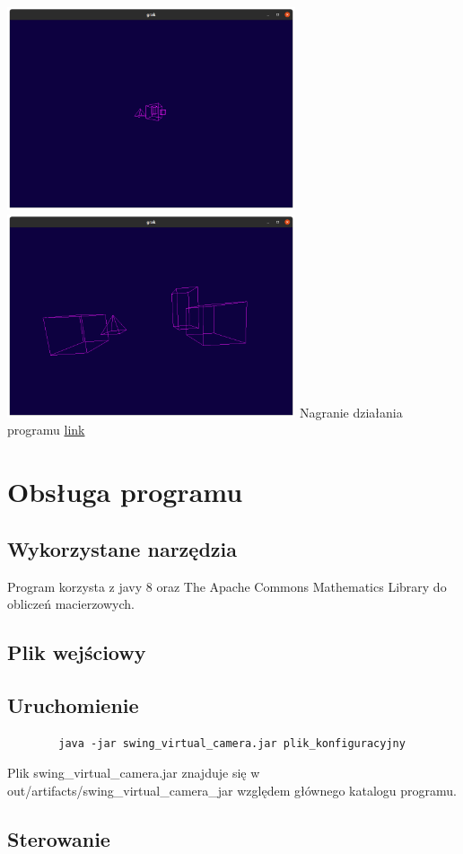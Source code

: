 \documentclass[11pt]{article}
\begin{document}
\includegraphics[width=8.5cm]{5.png}
\includegraphics[width=8.5cm]{7.png}
Nagranie działania programu \href{https://youtu.be/Wztjls1sywg}{\color{blue}link}
\section{Obsługa programu}
\subsection{Wykorzystane narzędzia}
Program korzysta z javy 8 oraz The Apache Commons Mathematics Library
do obliczeń macierzowych.
\subsection{Plik wejściowy}
\subsection{Uruchomienie}
    \begin{verbatim}
        java -jar swing_virtual_camera.jar plik_konfiguracyjny
    \end{verbatim}
    Plik swing\_virtual\_camera.jar znajduje się w 
    out/artifacts/swing\_virtual\_camera\_jar
    względem głównego katalogu programu.
\subsection{Sterowanie}
\end{document}
